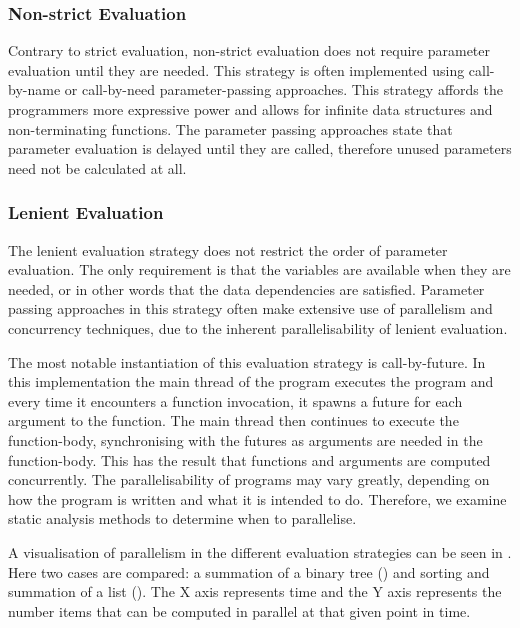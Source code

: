 \subsubsection{Non-strict Evaluation}
Contrary to strict evaluation, non-strict evaluation does not require parameter evaluation until they are needed\cite{hudak1989conception}. This strategy is often implemented using call-by-name or call-by-need parameter-passing approaches. This strategy affords the programmers more expressive power\cite{bird1997more} and allows for infinite data structures and non-terminating functions\cite[p.~103]{huttel2010transitions}. The parameter passing approaches state that parameter evaluation is delayed until they are called, therefore unused parameters need not be calculated at all.

\subsubsection{Lenient Evaluation}
The lenient evaluation strategy does not restrict the order of parameter evaluation. The only requirement is that the variables are available when they are needed, or in other words that the data dependencies are satisfied. Parameter passing approaches in this strategy often make extensive use of parallelism and concurrency techniques, due to the inherent parallelisability of lenient evaluation\cite{DBLP:journals/cl/Tremblay-parallel}.

The most notable instantiation of this evaluation strategy is call-by-future\cite{baker1977incremental}. In this implementation the main thread of the program executes the program and every time it encounters a function invocation, it spawns a future for each argument to the function. The main thread then continues to execute the function-body, synchronising with the futures as arguments are needed in the function-body. This has the result that functions and arguments are computed concurrently. The parallelisability of programs may vary greatly, depending on how the program is written and what it is intended to do. Therefore, we examine static analysis methods to determine when to parallelise.

A visualisation of parallelism in the different evaluation strategies can be seen in . Here two cases are compared: a summation of a binary tree () and sorting and summation of a list (). The X axis represents time and the Y axis represents the number items that can be computed in parallel at that given point in time.

